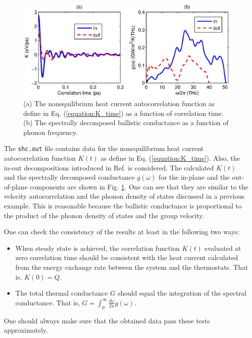 \documentclass[12pt,a4paper]{report}
\begin{document}
\begin{figure}[h]
\begin{center}
\includegraphics[width=\columnwidth]{ex4b.eps}
\caption{(a) The nonequilibrium heat current autocorrelation function as define in Eq. (\ref{equation:K_time}) as a function of correlation time. (b) The spectrally decomposed ballistic conductance as a function of phonon frequency. }
\label{figure:ex4b}
\end{center}
\end{figure}


The \verb"shc.out" file contains data for the nonequilibrium heat current autocorrelation function $K(t)$ as define in Eq. (\ref{equation:K_time}). Also, the in-out decompositions introduced in Ref. \cite{fan2017prb} is considered. The calculated $K(t)$ and the spectrally decomposed conductance $g(\omega)$ for the in-plane and the out-of-plane components are shown in Fig. \ref{figure:ex4b}. One can see that they are similar to the velocity autocorrelation and the phonon density of states discussed in a previous example. This is reasonable because the ballistic conductance is proportional to the product of the phonon density of states and the group velocity.

One can check the consistency of the results at least in the following two ways:
\begin{itemize}
\item When steady state is achieved, the correlation function $K(t)$ evaluated at zero correlation time should be consistent with the heat current calculated from the energy exchange rate between the system and the thermostats. That is, $K(0)=Q$.
\item The total thermal conductance $G$ should equal the integration of the spectral conductance. That is, $G = \int_0^{\infty} \frac{d\omega}{2\pi} g(\omega)$.
\end{itemize}
One should always make sure that the obtained data pass these tests approximately.



\end{document}
